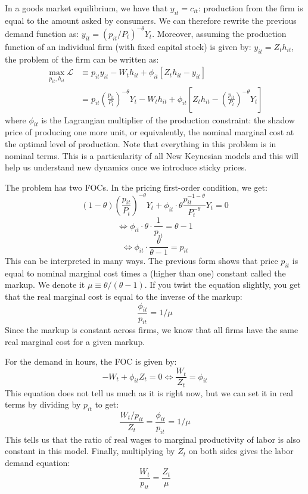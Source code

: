 \documentclass[12pt]{report}
\begin{document}
In a goods market equilibrium, we have that $y_{it} = c_{it}$: production from the firm is equal to the amount asked by consumers. We can therefore rewrite the previous demand function as: $y_{it} = \left(p_{it}/P_t\right)^{-\theta} Y_t $. Moreover, assuming the production function of an individual firm (with fixed capital stock) is given by: $y_{it} = Z_th_{it} $, the problem of the firm can be written as: \begin{align*} 
\max_{p_{it}, h_{it}} \mathcal{L} & \equiv p_{it}y_{it} - W_t h_{it} + \phi_{it}\left[Z_th_{it} - y_{it}\right] \\
& =  p_{it}\left(\frac{p_{it}}{P_t}\right)^{-\theta} Y_t - W_t h_{it} + \phi_{it}\left[Z_th_{it} - \left(\frac{p_{it}}{P_t}\right)^{-\theta} Y_t\right]
\end{align*} where $\phi_{it}$ is the Lagrangian multiplier of the production constraint: the shadow price of producing one more unit, or equivalently, the nominal marginal cost at the optimal level of production. Note that everything in this problem is in nominal terms. This is a particularity of all New Keynesian models and this will help us understand new dynamics once we introduce sticky prices.

The problem has two FOCs. In the pricing first-order condition, we get: $$ (1-\theta)\left(\frac{p_{it}}{P_t}\right)^{-\theta} Y_t + \phi_{it}\cdot\theta \frac{p_{it}^{-1-\theta}}{P_t^{-\theta}} Y_t = 0 $$ $$\Leftrightarrow \phi_{it}\cdot \theta \cdot \frac{1}{p_{it}} = \theta - 1 $$ $$\Leftrightarrow \phi_{it} \cdot \frac{\theta}{\theta - 1} =  p_{it}$$ This can be interpreted in many ways. The previous form shows that price $p_{it}$ is equal to nominal marginal cost times a (higher than one) constant called the markup. We denote it $\mu \equiv \theta/(\theta - 1)$. If you twist the equation slightly, you get that the real marginal cost is equal to the inverse of the markup: $$\frac{\phi_{it}}{p_{it}} = 1/\mu $$ Since the markup is constant across firms, we know that all firms have the same real marginal cost for a given markup.

For the demand in hours, the FOC is given by: $$- W_t + \phi_{it} Z_t = 0 \Leftrightarrow \frac{W_t}{Z_t} = \phi_{it}$$ This equation does not tell us much as it is right now, but we can set it in real terms by dividing by $p_{it}$ to get: $$\frac{W_t/p_{it}}{Z_t} = \frac{\phi_{it}}{p_{it}} = 1/\mu $$ This tells us that the ratio of real wages to marginal productivity of labor is also constant in this model. Finally, multiplying by $Z_t$ on both sides gives the labor demand equation: $$ \frac{W_t}{p_{it}} = \frac{Z_t}{\mu} $$
\end{document}
